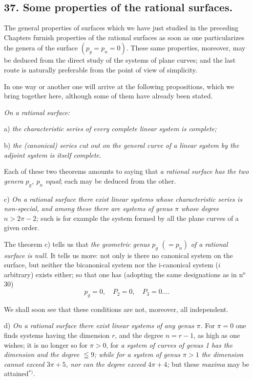 \documentclass{article}
\begin{document}

\subsection*{37. Some properties of the rational surfaces.}

The general properties of surfaces which we have just studied in the preceding Chapters furnish properties of the rational surfaces as soon as one particularizes the genera of the surface $(p_{g} = p_{n} = 0)$. These same properties, moreover, may be deduced from the direct study of the systems of plane curves; and the last route is naturally preferable from the point of view of simplicity.

In one way or another one will arrive at the following propositions, which we bring together here, although some of them have already been stated.

\emph{On a rational surface:}

a) \emph{the characteristic series of every complete linear system is complete;}

b) \emph{the (canonical) series cut out on the general curve of a linear system by the adjoint system is itself complete.}

Each of these two theorems amounts to saying that \emph{a rational surface has the two genera $p_{g}$, $p_{n}$ equal}; each may be deduced from the other.

c) \emph{On a rational surface there exist linear systems whose characteristic series is non-special, and among these there are systems of genus $\pi$ whose degree $n > 2\pi - 2$;} such is for example the system formed by all the plane curves of a given order.

The theorem c) tells us that \emph{the geometric genus $p_{g}$ $(= p_{n})$ of a rational surface is null.} It tells us more: not only is there no canonical system on the surface, but neither the bicanonical system nor the i-canonical system ($i$ arbitrary) exists either; so that one has (adopting the same designations as in n${}^{\text{o}}$ 30)
\[ p_{g} = 0, \quad P_{2} = 0, \quad P_{3} = 0 \ldots . \]

We shall soon see that these conditions are not, moreover, all independent.

d) \emph{On a rational surface there exist linear systems of any genus $\pi$.} For $\pi = 0$ one finds systems having the dimension $r$, and the degree $n = r - 1$, as high as one wishes; it is no longer so for $\pi > 0$, for \emph{a system of curves of genus 1 has the dimension and the degree $\leqq 9$; while for a system of genus $\pi > 1$ the dimension cannot exceed $3\pi + 5$, nor can the degree exceed $4\pi + 4$;} but these \emph{maxima} may be attained${}^{*)}$.
\end{document}
